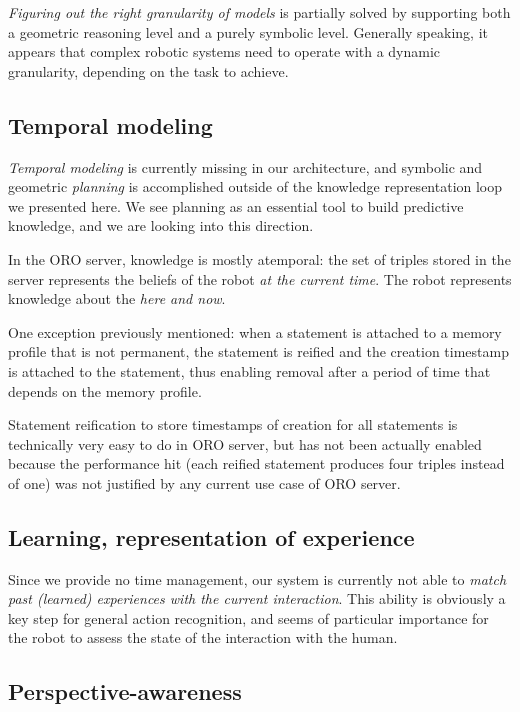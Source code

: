 \emph{Figuring out the right granularity of models} is partially solved by
supporting both a geometric reasoning level and a purely symbolic level.
Generally speaking, it appears that complex robotic systems need to operate
with a dynamic granularity, depending on the task to achieve.

\subsection{Temporal modeling} 

\emph{Temporal modeling} is currently missing in our architecture, and symbolic
and geometric \emph{planning} is accomplished outside of the knowledge
representation loop we presented here. We see planning as an essential tool to
build predictive knowledge, and we are looking into this direction.

In the ORO server, knowledge is mostly atemporal: the set of triples stored in
the server represents the beliefs of the robot \emph{at the current time}. The
robot represents knowledge about the \emph{here and now}.

One exception previously mentioned: when a statement is attached to a memory
profile that is not permanent, the statement is reified and the creation
timestamp is attached to the statement, thus enabling removal after a period of
time that depends on the memory profile.

Statement reification to store timestamps of creation for all statements is
technically very easy to do in ORO server, but has not been actually enabled
because the performance hit (each reified statement produces four triples
instead of one) was not justified by any current use case of ORO server.

\subsection{Learning, representation of experience}

Since we provide no time management, our system is currently not able to
\emph{match past (learned) experiences with the current interaction}.  This
ability is obviously a key step for general action recognition, and seems of
particular importance for the robot to assess the state of the interaction with
the human.

\subsection{Perspective-awareness} 

